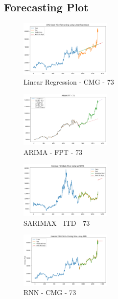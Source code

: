 \documentclass{ieeeojies}
\begin{document}
\subsection{Forecasting Plot}
\begin{figure} [H]
    \centering
    \includegraphics[width=0.4\textwidth]{bibliography/Figure/LR_CMG_73.png}
    \caption{Linear Regression - CMG - 73}
    \label{fig:LR_CMG_73}
\end{figure}
\begin{figure} [H]
    \centering
    \includegraphics[width=0.4\textwidth]{bibliography/Figure/ARIMA_FPT_73.png}
    \caption{ARIMA - FPT - 73}
    \label{fig:ARIMA_FPT_73}
\end{figure}
\begin{figure} [H]
    \centering
    \includegraphics[width=0.4\textwidth]{bibliography/Figure/SARIMAX_ITD_73.png}
    \caption{SARIMAX - ITD - 73}
    \label{fig:SARIMAX_ITD_73}
\end{figure}
\begin{figure} [H]
    \centering
    \includegraphics[width=0.4\textwidth]{bibliography/Figure/RNN_CMG_73.png}
    \caption{RNN - CMG - 73}
    \label{fig:RNN_CMG_73}
\end{figure}
\end{document}
